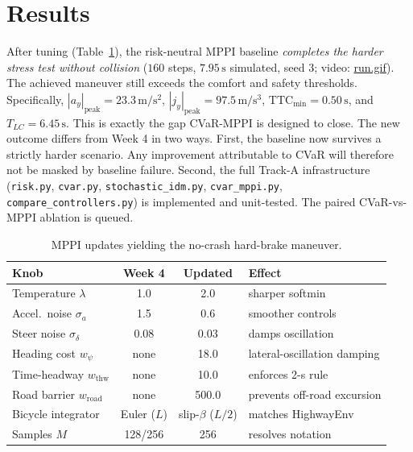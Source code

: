 \documentclass[letterpaper, 10 pt, conference]{ieeeconf}  %
\begin{document}
\section{Results}
After tuning (Table~\ref{tab:updates}), the risk-neutral MPPI baseline \emph{completes the harder stress test without collision} ($160$ steps, $7.95\,\mathrm{s}$ simulated, seed 3; video: \href{https://drive.google.com/REPLACE-WITH-YOUR-LINK}{run.gif}). The achieved maneuver still exceeds the comfort and safety thresholds. Specifically, $|a_y|_{\mathrm{peak}}\!=\!23.3\,\mathrm{m/s^2}$, $|j_y|_{\mathrm{peak}}\!=\!97.5\,\mathrm{m/s^3}$, $\mathrm{TTC}_{\min}\!=\!0.50\,\mathrm{s}$, and $T_{LC}\!=\!6.45\,\mathrm{s}$. This is exactly the gap CVaR-MPPI is designed to close. The new outcome differs from Week 4 in two ways. First, the baseline now survives a strictly harder scenario. Any improvement attributable to CVaR will therefore not be masked by baseline failure. Second, the full Track-A infrastructure (\texttt{risk.py}, \texttt{cvar.py}, \texttt{stochastic\_idm.py}, \texttt{cvar\_mppi.py}, \texttt{compare\_controllers.py}) is implemented and unit-tested. The paired CVaR-vs-MPPI ablation is queued.

\begin{table}[h]
\centering\footnotesize
\caption{MPPI updates yielding the no-crash hard-brake maneuver.}
\label{tab:updates}
\begin{tabular}{@{}lccl@{}}
\toprule
\textbf{Knob} & \textbf{Week 4} & \textbf{Updated} & \textbf{Effect} \\
\midrule
Temperature $\lambda$            & 1.0   & 2.0   & sharper softmin \\
Accel.\ noise $\sigma_a$         & 1.5   & 0.6   & smoother controls \\
Steer noise $\sigma_\delta$      & 0.08  & 0.03  & damps oscillation \\
Heading cost $w_\psi$            & none  & 18.0  & lateral-oscillation damping \\
Time-headway $w_{\mathrm{thw}}$  & none  & 10.0  & enforces 2-s rule \\
Road barrier $w_{\mathrm{road}}$ & none  & 500.0 & prevents off-road excursion \\
Bicycle integrator               & Euler ($L$) & slip-$\beta$ ($L/2$) & matches HighwayEnv \\
Samples $M$                      & 128/256 & 256 & resolves notation \\
\bottomrule
\end{tabular}
\end{table}
\end{document}
